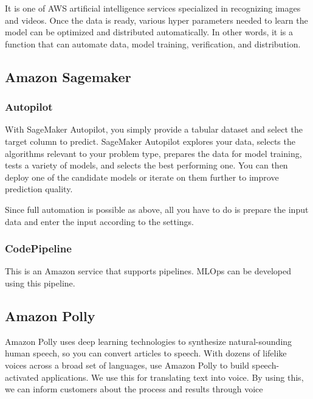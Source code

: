 It is one of AWS artificial intelligence services specialized in recognizing images and videos. Once the data is ready, various hyper parameters needed to learn the model can be optimized and distributed automatically. In other words, it is a function that can automate data, model training, verification, and distribution.


\subsection{\textbf{Amazon Sagemaker}}
\subsubsection{\textbf{Autopilot}}

 With SageMaker Autopilot, you simply provide a tabular dataset and select the target column to predict. SageMaker Autopilot explores your data, selects the algorithms relevant to your problem type, prepares the data for model training, tests a variety of models, and selects the best performing one. You can then deploy one of the candidate models or iterate on them further to improve prediction quality.

 Since full automation is possible as above, all you have to do is prepare the input data and enter the input according to the settings.

\subsubsection{\textbf{CodePipeline}}

This is an Amazon service that supports pipelines. MLOps can be developed using this pipeline.

\subsection{\textbf{Amazon Polly}}

Amazon Polly uses deep learning technologies to synthesize natural-sounding human speech, so you can convert articles to speech. With dozens of lifelike voices across a broad set of languages, use Amazon Polly to build speech-activated applications.
We use this for translating text into voice. By using this, we can inform customers about the process and results through voice


